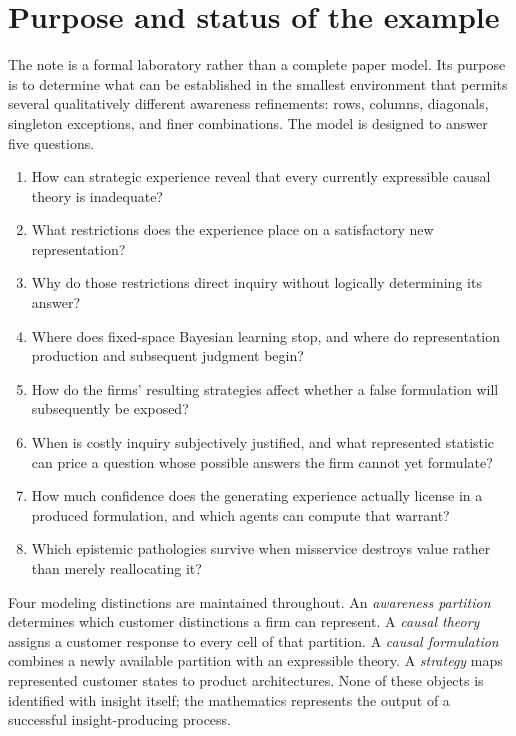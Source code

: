 \documentclass[11pt]{article}
\begin{document}
\section{Purpose and status of the example}

The note is a formal laboratory rather than a complete paper model.  Its
purpose is to determine what can be established in the smallest environment
that permits several qualitatively different awareness refinements: rows,
columns, diagonals, singleton exceptions, and finer combinations.  The model is
designed to answer five questions.
\begin{enumerate}[label=(\roman*)]
  \item How can strategic experience reveal that every currently expressible
  causal theory is inadequate?
  \item What restrictions does the experience place on a satisfactory new
  representation?
  \item Why do those restrictions direct inquiry without logically determining
  its answer?
  \item Where does fixed-space Bayesian learning stop, and where do
  representation production and subsequent judgment begin?
  \item How do the firms' resulting strategies affect whether a false
  formulation will subsequently be exposed?
  \item When is costly inquiry subjectively justified, and what represented
  statistic can price a question whose possible answers the firm cannot yet
  formulate?
  \item How much confidence does the generating experience actually license in
  a produced formulation, and which agents can compute that warrant?
  \item Which epistemic pathologies survive when misservice destroys value
  rather than merely reallocating it?
\end{enumerate}

Four modeling distinctions are maintained throughout.  An \emph{awareness
partition} determines which customer distinctions a firm can represent.  A
\emph{causal theory} assigns a customer response to every cell of that
partition.  A \emph{causal formulation} combines a newly available partition
with an expressible theory.  A \emph{strategy} maps represented customer states
to product architectures.  None of these objects is identified with insight
itself; the mathematics represents the output of a successful insight-producing
process.
\end{document}
